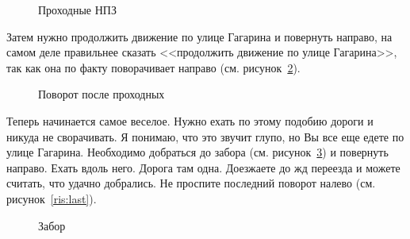 \documentclass[a4paper, 12pt]{extarticle}
\begin{document}
\begin{figure}[h]
	\caption{Проходные НПЗ}
	\label{ris:NPZ}
\end{figure}

\par Затем нужно продолжить движение по улице Гагарина и повернуть направо, на самом деле правильнее сказать <<продолжить движение по улице Гагарина>>, так как она по факту поворачивает направо (см. рисунок~\ref{ris:afterNPZ}).

\begin{figure}[h]
	\caption{Поворот после проходных}
	\label{ris:afterNPZ}
\end{figure}

\par Теперь начинается самое веселое. Нужно ехать по этому подобию дороги и никуда не сворачивать. Я понимаю, что это звучит глупо, но Вы все еще едете по улице Гагарина. Необходимо добраться до забора (см. рисунок~\ref{ris:zabor}) и повернуть направо. Ехать вдоль него. Дорога там одна. Доезжаете до жд переезда и можете считать, что удачно добрались. Не проспите последний поворот налево (см. рисунок~\ref{ris:last}).

\begin{figure}[h]
	\caption{Забор}
	\label{ris:zabor}
\end{figure}
\end{document}
